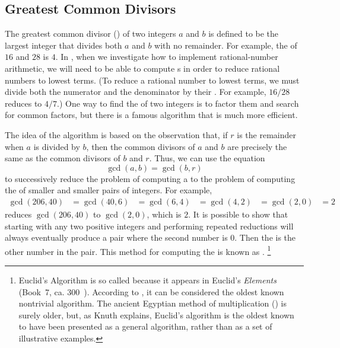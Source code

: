 \subsection{Greatest Common Divisors}
\label{Section 1.2.5}

The greatest common divisor () of two integers \( a \) and \( b \) is defined to be the largest integer that divides both \( a \) and \( b \) with no remainder.
For example, the  of \( 16 \) and \( 28 \) is \( 4 \).
In , when we investigate how to implement rational-number arithmetic, we will need to be able to compute s in order to reduce rational numbers to lowest terms.
(To reduce a rational number to lowest terms, we must divide both the numerator and the denominator by their .
For example, \( 16/28 \) reduces to \( 4/7 \).)
One way to find the  of two integers is to factor them and search for common factors, but there is a famous algorithm that is much more efficient.

The idea of the algorithm is based on the observation that, if \( r \) is the remainder when \( a \) is divided by \( b \), then the common divisors of \( a \) and \( b \) are precisely the same as the common divisors of \( b \) and \( r \).
Thus, we can use the equation
\[
	\gcd(a, b) = \gcd(b, r)
\]
to successively reduce the problem of computing a  to the problem
of computing the  of smaller and smaller pairs of integers.  For
example,
\begin{align*}
	\gcd(206,40)
	&= \gcd(40,6)
	&= \gcd(6,4)
	&= \gcd(4,2)
	&= \gcd(2,0)
	&= 2
\end{align*}
reduces \( \gcd(206, 40) \) to \( \gcd(2, 0) \), which is \( 2 \).
It is possible to show that starting with any two positive integers and performing repeated reductions will always eventually produce a pair where the second number is \( 0 \).
Then the  is the other number in the pair.
This method for computing the  is known as .%
\footnote{
	Euclid’s Algorithm is so called because it appears in Euclid’s \textit{Elements} (Book 7, ca. 300 ).
	According to , it can be considered the oldest known nontrivial algorithm.
	The ancient Egyptian method of multiplication () is surely older, but, as Knuth explains, Euclid’s algorithm is the oldest known to have been presented as a general algorithm, rather than as a set of illustrative examples.
}

